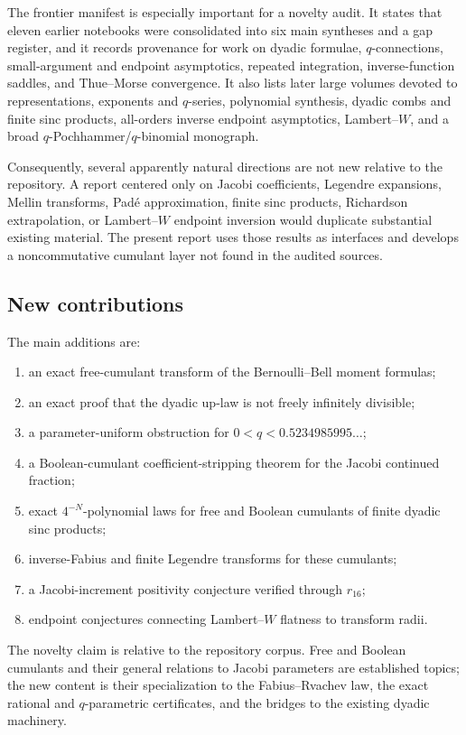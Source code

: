 \documentclass[11pt,oneside]{article}
\theoremstyle{definition}
\theoremstyle{remark}
\begin{document}
The frontier manifest is especially important for a novelty audit. It states that eleven earlier notebooks were consolidated into six main syntheses and a gap register, and it records provenance for work on dyadic formulae, \(q\)-connections, small-argument and endpoint asymptotics, repeated integration, inverse-function saddles, and Thue--Morse convergence. It also lists later large volumes devoted to representations, exponents and \(q\)-series, polynomial synthesis, dyadic combs and finite sinc products, all-orders inverse endpoint asymptotics, Lambert--\(W\), and a broad \(q\)-Pochhammer/\(q\)-binomial monograph.

Consequently, several apparently natural directions are not new relative to the repository. A report centered only on Jacobi coefficients, Legendre expansions, Mellin transforms, Pad\'e approximation, finite sinc products, Richardson extrapolation, or Lambert--\(W\) endpoint inversion would duplicate substantial existing material. The present report uses those results as interfaces and develops a noncommutative cumulant layer not found in the audited sources.

\subsection{New contributions}
The main additions are:
\begin{enumerate}[label=\textbf{N\arabic*.},leftmargin=3.2em]
\item an exact free-cumulant transform of the Bernoulli--Bell moment formulas;
\item an exact proof that the dyadic up-law is not freely infinitely divisible;
\item a parameter-uniform obstruction for \(0<q<0.5234985995\ldots\);
\item a Boolean-cumulant coefficient-stripping theorem for the Jacobi continued fraction;
\item exact \(4^{-N}\)-polynomial laws for free and Boolean cumulants of finite dyadic sinc products;
\item inverse-Fabius and finite Legendre transforms for these cumulants;
\item a Jacobi-increment positivity conjecture verified through \(r_{16}\);
\item endpoint conjectures connecting Lambert--\(W\) flatness to transform radii.
\end{enumerate}
The novelty claim is relative to the repository corpus. Free and Boolean cumulants and their general relations to Jacobi parameters are established topics; the new content is their specialization to the Fabius--Rvachev law, the exact rational and \(q\)-parametric certificates, and the bridges to the existing dyadic machinery.
\end{document}
